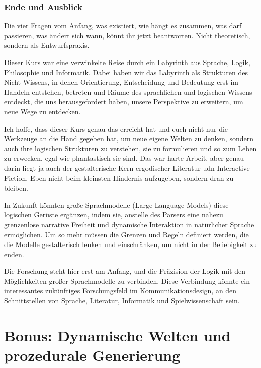 \documentclass[parskip=half,a4paper,11pt]{scrreprt}
\begin{document}
\subsection{Ende und Ausblick}

Die vier Fragen vom Anfang, was existiert, wie hängt es zusammen, was darf passieren, was ändert sich wann, könnt ihr jetzt beantworten. Nicht theoretisch, sondern als Entwurfspraxis.

Dieser Kurs war eine verwinkelte Reise durch ein Labyrinth aus Sprache, Logik, Philosophie und Informatik. Dabei haben wir das Labyrinth als Strukturen des Nicht-Wissens, in denen Orientierung, Entscheidung und Bedeutung erst im Handeln entstehen, betreten und Räume des sprachlichen und logischen Wissens entdeckt, die uns herausgefordert haben, unsere Perspektive zu erweitern, um neue Wege zu entdecken. 

Ich hoffe, dass dieser Kurs genau das erreicht hat und euch nicht nur die Werkzeuge an die Hand gegeben hat, um neue eigene Welten zu denken, sondern auch ihre logischen Strukturen zu verstehen, sie zu formulieren und so zum Leben zu erwecken, egal wie phantastisch sie sind. Das war harte Arbeit, aber genau darin liegt ja auch der gestalterische Kern ergodischer Literatur udn Interactive Fiction. Eben nicht beim kleinsten Hindernis aufzugeben, sondern dran zu bleiben.

In Zukunft könnten große Sprachmodelle (Large Language Models) diese logischen Gerüste ergänzen, indem sie, anstelle des Parsers eine nahezu grenzenlose narrative Freiheit und dynamische Interaktion in natürlicher Sprache ermöglichen. Um so mehr müssen die Grenzen und Regeln definiert werden, die die Modelle gestalterisch lenken und einschränken, um nicht in der Beliebigkeit zu enden. 

Die Forschung steht hier erst am Anfang, und die Präzision der Logik mit den Möglichkeiten großer Sprachmodelle zu verbinden. Diese Verbindung könnte ein interessantes zukünftiges Forschungsfeld im Kommunikationsdesign, an den Schnittstellen von Sprache, Literatur, Informatik und Spielwissenschaft sein.




\chapter{Bonus: Dynamische Welten und prozedurale Generierung}
\end{document}
